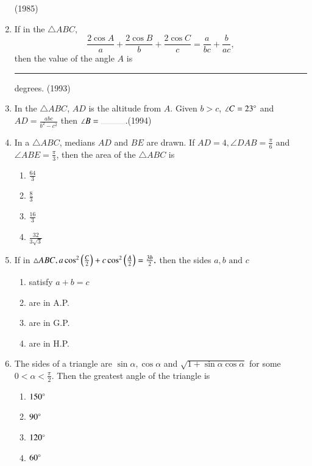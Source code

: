 \begin{enumerate}[label=\thesubsection.\arabic*,ref=\thesubsection.\theenumi]
	    \hfill (1985)
    \item If in the $\triangle ABC$, 
	    $$\frac{2\cos A}{a} + \frac{2\cos B}{b} + \frac{2\cos C}{c} = \frac{a}{bc} +  \frac{b}{ac},$$ 
		then the value of the angle $A$ is \rule{1cm}{0.1pt} degrees. \hfill (1993)
    \item In the $\triangle ABC$, $AD$ is the altitude from $A$. Given $b>c$, $\angle C=23 \degree$ and $AD = \frac{abc}{b^2 - c^2}$ then $\angle B =  \rule{1cm}{0.1pt}$.\hfill (1994)
%
\item In a $\triangle{ABC}$, medians $AD$ and $BE$ are drawn. If $AD=4,\angle{DAB}=\frac{\pi}{6}$  and $\angle{ABE}=\frac{\pi}{3}$, then the area of the $\triangle{ABC}$ is \hfill{}
\begin{multicols}{4}
\begin{enumerate}
        \item $\frac{64}{3}$                    
        \item $\frac{8}{3}$ 
        \item $\frac{16}{3}$ 
        \item $\frac{32}{3\sqrt{3}}$
\end{enumerate}
\end{multicols} 
%
\item If in $\triangle{ABC},a\cos^2\left(\frac{{C}}{2}\right) + c\cos^2\left(\frac{{A}}{2}\right) = \frac{3b}{2},$ then the sides $a,b\text{ and }c$ \hfill{}
\begin{multicols}{4}
\begin{enumerate}
        \item satisfy $a+b=c$                    
        \item are in A.P. 
        \item are in G.P. 
        \item are in H.P.
\end{enumerate}
\end{multicols} 
%
\item The sides of a triangle are $\sin\alpha,\cos\alpha$ and $ \sqrt{1+\sin\alpha\cos\alpha}$ for some $0<\alpha<\frac{\pi}{2}.$ Then the greatest angle of the triangle is \hfill{}
\begin{multicols}{4}
\begin{enumerate}
        \item $150\degree$                    
        \item $90\degree$ 
        \item $120\degree$
        \item $60\degree$

\end{enumerate}
\end{multicols}
\end{enumerate}
